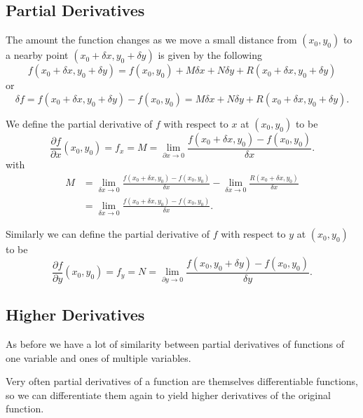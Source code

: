 \documentclass[10pt, a4paper]{article}
\begin{document}
\subsection{Partial Derivatives}
The amount the function changes as we move a small distance from $(x_0, y_0)$ to a nearby point $(x_0 + \delta x, y_0 + \delta y)$ is given by the following
\[
f(x_0 + \delta x, y_0 + \delta y) = f(x_0, y_0) + M\delta x + N\delta y + R(x_0 + \delta x, y_0 + \delta y)
\]
or
\[
\delta f = f(x_0 + \delta x, y_0 + \delta y) - f(x_0, y_0) = M\delta x + N\delta y + R(x_0 + \delta x, y_0 + \delta y).
\]

We define the partial derivative of $f$ with respect to $x$ at $(x_0, y_0)$ to be
\[
\frac{\partial f}{\partial x}(x_0, y_0) = f_x = M = \lim_{\partial x \rightarrow 0}\frac{f(x_0 + \delta x, y_0) - f(x_0, y_0)}{\delta x}.
\]
with
\begin{align*}
    M &= \lim_{\delta x \rightarrow 0}\frac{f(x_0 + \delta x, y_0) - f(x_0, y_0)}{\delta x} - \lim_{\delta x \rightarrow 0}\frac{R(x_0 + \delta x, y_0)}{\delta x} \\
    &= \lim_{\delta x \rightarrow 0}\frac{f(x_0 + \delta x, y_0) - f(x_0, y_0)}{\delta x}.
\end{align*}

Similarly we can define the partial derivative of $f$ with respect to $y$ at $(x_0, y_0)$ to be
\[
\frac{\partial f}{\partial y}(x_0, y_0) = f_y = N = \lim_{\partial y \rightarrow 0}\frac{f(x_0, y_0 + \delta y) - f(x_0, y_0)}{\delta y}.
\]
\begin{center}
\end{center}
\hfill

\subsection{Higher Derivatives}
As before we have a lot of similarity between partial derivatives of functions of one variable and ones of multiple variables.

Very often partial derivatives of a function are themselves differentiable functions,
so we can differentiate them again to yield higher derivatives of the original function.
\end{document}
